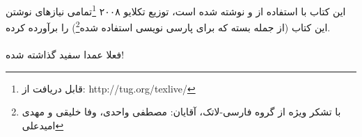 این کتاب با استفاده از \mbox{\lr{\TeX\\}} و \mbox{\lr{\XeTeX\\}} نوشته شده است، توزیع تکلایو ۲۰۰۸ \footnote{قابل دریافت از: http://tug.org/texlive/}تمامی نیازهای نوشتن این کتاب (از جمله بسته \mbox{\lr{\XePersian\\}} که برای پارسی نویسی استفاده شده\footnote{با تشکر ویژه از گروه فارسی-لاتک،‌ آقایان: مصطفی واحدی، وفا خلیقی و مهدی امیدعلی}) را برآورده کرده.\\
\paragraph{}
{\sols فعلا عمدا سفید گذاشته شده!}
